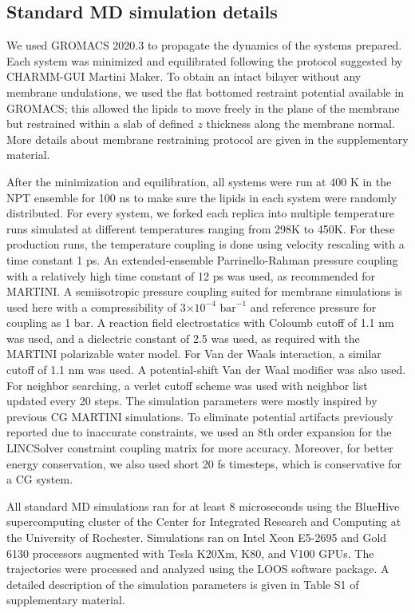 \documentclass{biophys-new}
\begin{document}
\subsection*{Standard MD simulation details}

We used GROMACS 2020.3\cite{Abraham2015} to propagate the dynamics of the systems prepared. 
Each system was minimized and equilibrated following the protocol suggested by CHARMM-GUI Martini Maker.
To obtain an intact bilayer without any membrane undulations, we used  
the flat bottomed restraint potential available in GROMACS; this allowed the lipids to move freely in the plane of the membrane but restrained within a slab of defined $z$ thickness along the membrane normal.  More details about membrane restraining protocol are given in the supplementary material.

After the minimization and equilibration, all systems were run at 400 K in the NPT ensemble for 100 ns to make sure the lipids in each system were randomly distributed.
For every system, we forked each replica into multiple temperature runs simulated at different temperatures ranging from 298K to 450K.
For these production runs, the temperature coupling is done using velocity rescaling\cite{Bussi2007} with a time constant 1 ps.
An extended-ensemble Parrinello-Rahman pressure coupling\cite{Parrinello1981} with a relatively high time constant of 12 ps was used, as recommended for MARTINI.  A semiisotropic pressure coupling suited for membrane simulations is used here with a compressibility of 3$\times 10^{-4}$ $\text{bar}^{-1}$ and reference pressure for coupling as 1 bar.
A reaction field electrostatics with Coloumb cutoff of 1.1 nm was used, and 
a dielectric constant of 2.5 was used, as required with the MARTINI polarizable water model.
For Van der Waals interaction, a similar cutoff of 1.1 nm was used.
A potential-shift Van der Waal modifier was also used.
For neighbor searching, a verlet cutoff scheme was used with neighbor list updated every 20 steps.
The simulation parameters were mostly inspired by previous CG MARTINI simulations\cite{DeJong2016}. 
To eliminate potential artifacts previously reported due to inaccurate constraints\cite{Javanainen2020}, we used an 8th order expansion for the LINCSolver constraint coupling matrix\cite{Hess1997} for more accuracy.
Moreover, for better energy conservation, we also used short 20 fs timesteps, which is conservative for a CG system.

All standard MD simulations ran for at least 8 microseconds using the BlueHive supercomputing cluster of the Center for Integrated Research and Computing at the University of Rochester.
Simulations ran on Intel Xeon E5-2695 and Gold 6130 processors augmented with Tesla K20Xm, K80, and V100 GPUs.   
The trajectories were processed and analyzed using the LOOS software package\cite{Romo2014}.
A detailed description of the simulation parameters is given in Table S1 of supplementary material. 
\end{document}
